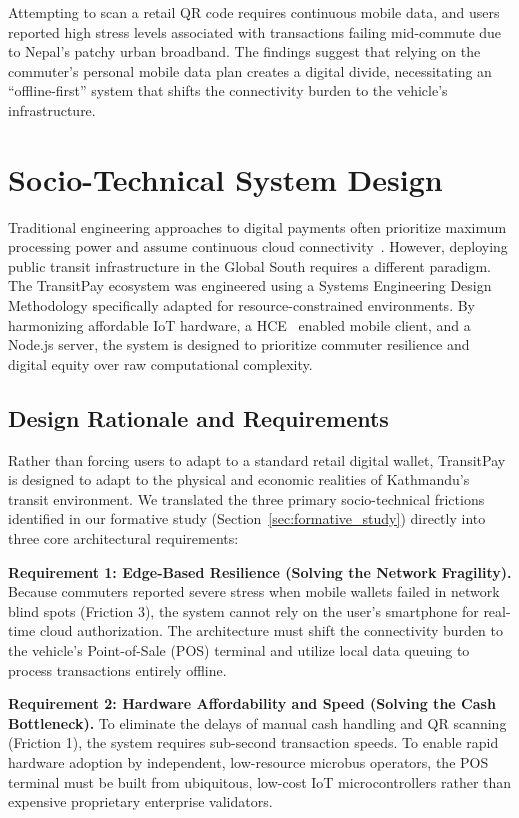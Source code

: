 \documentclass[manuscript,review,anonymous]{acmart}
\begin{document}
Attempting to scan a retail QR code requires continuous mobile data, and users reported high stress levels associated with transactions failing mid-commute due to Nepal's patchy urban broadband. The findings suggest that relying on the commuter's personal mobile data plan creates a digital divide, necessitating an ``offline-first'' system that shifts the connectivity burden to the vehicle's infrastructure.

\section{Socio-Technical System Design}

Traditional engineering approaches to digital payments often prioritize maximum processing power and assume continuous cloud connectivity~\cite{iyengar2024edge}. However, deploying public transit infrastructure in the Global South requires a different paradigm. The TransitPay ecosystem was engineered using a Systems Engineering Design Methodology specifically adapted for resource-constrained environments. By harmonizing affordable IoT hardware, a HCE~\cite{alliance2014host} enabled mobile client, and a Node.js server, the system is designed to prioritize commuter resilience and digital equity over raw computational complexity.

\subsection{Design Rationale and Requirements}

Rather than forcing users to adapt to a standard retail digital wallet, TransitPay is designed to adapt to the physical and economic realities of Kathmandu's transit environment. We translated the three primary socio-technical frictions identified in our formative study (Section~\ref{sec:formative_study}) directly into three core architectural requirements:

\textbf{Requirement 1: Edge-Based Resilience (Solving the Network Fragility). } Because commuters reported severe stress when mobile wallets failed in network blind spots (Friction 3), the system cannot rely on the user's smartphone for real-time cloud authorization. The architecture must shift the connectivity burden to the vehicle's Point-of-Sale (POS) terminal and utilize local data queuing to process transactions entirely offline.

\textbf{Requirement 2: Hardware Affordability and Speed (Solving the Cash Bottleneck).} To eliminate the delays of manual cash handling and QR scanning (Friction 1), the system requires sub-second transaction speeds. To enable rapid hardware adoption by independent, low-resource microbus operators, the POS terminal must be built from ubiquitous, low-cost IoT microcontrollers rather than expensive proprietary enterprise validators.
\end{document}

